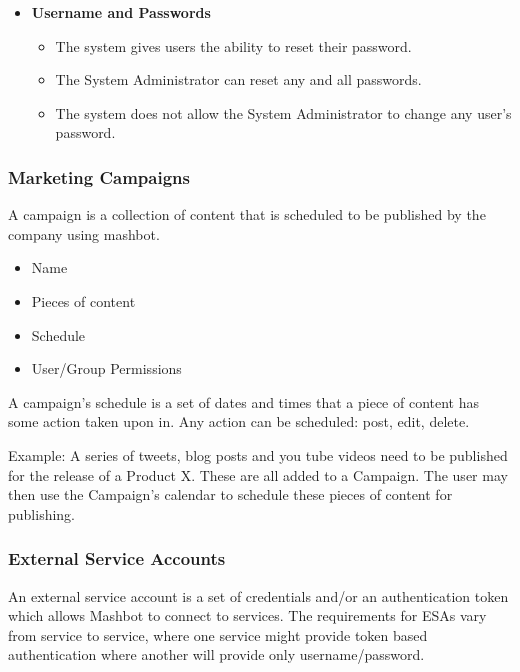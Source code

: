 \documentclass{report}
\begin{document}
\begin{itemize}
				\item \textbf{Username and Passwords}
					\begin{itemize}
						\item The system gives users the ability to reset their 
						password.
						\item The System Administrator can reset any and all 
						passwords.
						\item The system does not allow the System Administrator 
						to change any user's password.
					\end{itemize}
			\end{itemize}

		\subsubsection{Marketing Campaigns} %
				A campaign is a collection of content that is scheduled to be 
				published by the company using mashbot.
                \begin{itemize}
                  \item Name
                  \item Pieces of content
                  \item Schedule
                  \item User/Group Permissions
                \end{itemize}
				A campaign's schedule is a set of dates and times that a piece 
				of content has some action taken upon in.  Any action can be 
				scheduled: post, edit, delete.
                
				Example: A series of tweets, blog posts and you tube videos 
		need to be published for the release of a Product X.  These are all 
		added to a Campaign.  The user may then use the Campaign's calendar to 
		schedule these pieces of content for publishing.
		\subsubsection{External Service Accounts} %
                An external service account is a set of credentials
                and/or an authentication token which allows Mashbot to
                connect to services.  The requirements for ESAs vary
                from service to service, where one service might
                provide token based authentication where another will
                provide only username/password.
\end{document}
